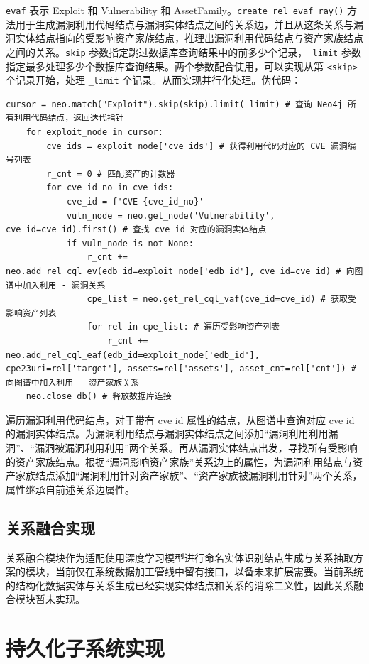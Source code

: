 \documentclass[a4paper,AutoFakeBold,oneside,12pt]{book}
\begin{document}
\lstinline|evaf| 表示 Exploit 和 Vulnerability 和 AssetFamily。\lstinline|create_rel_evaf_ray()| 方法用于生成漏洞利用代码结点与漏洞实体结点之间的关系边，并且从这条关系与漏洞实体结点指向的受影响资产家族结点，推理出漏洞利用代码结点与资产家族结点之间的关系。\lstinline|skip| 参数指定跳过数据库查询结果中的前多少个记录，\lstinline|_limit| 参数指定最多处理多少个数据库查询结果。两个参数配合使用，可以实现从第 \lstinline|<skip>| 个记录开始，处理 \lstinline|_limit| 个记录。从而实现并行化处理。伪代码：
\begin{lstlisting}[style=lgeneral]
	cursor = neo.match("Exploit").skip(skip).limit(_limit) # 查询 Neo4j 所有利用代码结点，返回迭代指针
	for exploit_node in cursor:
		cve_ids = exploit_node['cve_ids'] # 获得利用代码对应的 CVE 漏洞编号列表
		r_cnt = 0 # 匹配资产的计数器
		for cve_id_no in cve_ids:
			cve_id = f'CVE-{cve_id_no}'
			vuln_node = neo.get_node('Vulnerability', cve_id=cve_id).first() # 查找 cve_id 对应的漏洞实体结点
			if vuln_node is not None:
				r_cnt += neo.add_rel_cql_ev(edb_id=exploit_node['edb_id'], cve_id=cve_id) # 向图谱中加入利用 - 漏洞关系
				cpe_list = neo.get_rel_cql_vaf(cve_id=cve_id) # 获取受影响资产列表
				for rel in cpe_list: # 遍历受影响资产列表
					r_cnt += neo.add_rel_cql_eaf(edb_id=exploit_node['edb_id'], cpe23uri=rel['target'], assets=rel['assets'], asset_cnt=rel['cnt']) # 向图谱中加入利用 - 资产家族关系
	neo.close_db() # 释放数据库连接
\end{lstlisting}

遍历漏洞利用代码结点，对于带有 cve id 属性的结点，从图谱中查询对应 cve id 的漏洞实体结点。为漏洞利用结点与漏洞实体结点之间添加“漏洞利用利用漏洞”、“漏洞被漏洞利用利用”两个关系。再从漏洞实体结点出发，寻找所有受影响的资产家族结点。根据“漏洞影响资产家族”关系边上的属性，为漏洞利用结点与资产家族结点添加“漏洞利用针对资产家族”、“资产家族被漏洞利用针对”两个关系，属性继承自前述关系边属性。

\subsection{关系融合实现}

关系融合模块作为适配使用深度学习模型进行命名实体识别结点生成与关系抽取方案的模块，当前仅在系统数据加工管线中留有接口，以备未来扩展需要。当前系统的结构化数据实体与关系生成已经实现实体结点和关系的消除二义性，因此关系融合模块暂未实现。

\section{持久化子系统实现}
\end{document}
